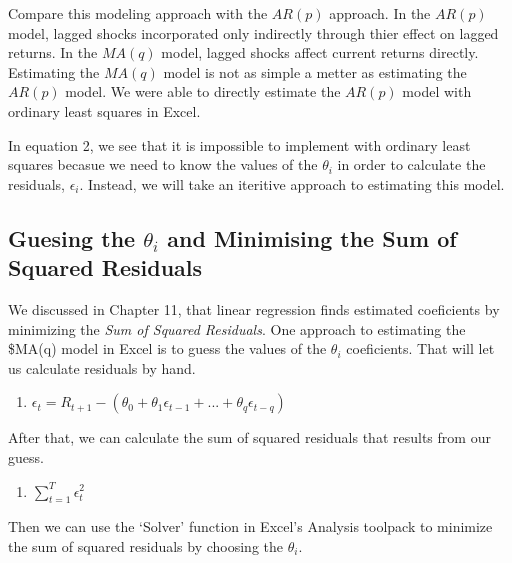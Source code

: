 \documentclass[]{book}
\providecommand{\tightlist}{%
  \setlength{\itemsep}{0pt}\setlength{\parskip}{0pt}}
\theoremstyle{definition}
\theoremstyle{definition}
\theoremstyle{remark}
\begin{document}
Compare this modeling approach with the \(AR(p)\) approach. In the
\(AR(p)\) model, lagged shocks incorporated only indirectly through
thier effect on lagged returns. In the \(MA(q)\) model, lagged shocks
affect current returns directly. Estimating the \(MA(q)\) model is not
as simple a metter as estimating the \(AR(p)\) model. We were able to
directly estimate the \(AR(p)\) model with ordinary least squares in
Excel.

In equation 2, we see that it is impossible to implement with ordinary
least squares becasue we need to know the values of the \(\theta_i\) in
order to calculate the residuals, \(\epsilon_i\). Instead, we will take
an iteritive approach to estimating this model.

\subsection{\texorpdfstring{Guesing the \(\theta_i\) and Minimising the
Sum of Squared
Residuals}{Guesing the \textbackslash{}theta\_i and Minimising the Sum of Squared Residuals}}\label{guesing-the-theta_i-and-minimising-the-sum-of-squared-residuals}

We discussed in Chapter 11, that linear regression finds estimated
coeficients by minimizing the \emph{Sum of Squared Residuals}. One
approach to estimating the \$MA(q) model in Excel is to guess the values
of the \(\theta_i\) coeficients. That will let us calculate residuals by
hand.

\begin{enumerate}
\def\labelenumi{\arabic{enumi}.}
\setcounter{enumi}{2}
\tightlist
\item
  \(\epsilon_{t} = R_{t+1} - (\theta_0 + \theta_1\epsilon_{t-1} + ... + \theta_q\epsilon_{t-q})\)
\end{enumerate}

After that, we can calculate the sum of squared residuals that results
from our guess.

\begin{enumerate}
\def\labelenumi{\arabic{enumi}.}
\setcounter{enumi}{3}
\tightlist
\item
  \(\sum_{t=1}^{T} \epsilon_t^2\)
\end{enumerate}

Then we can use the `Solver' function in Excel's Analysis toolpack to
minimize the sum of squared residuals by choosing the \(\theta_i\).
\end{document}
